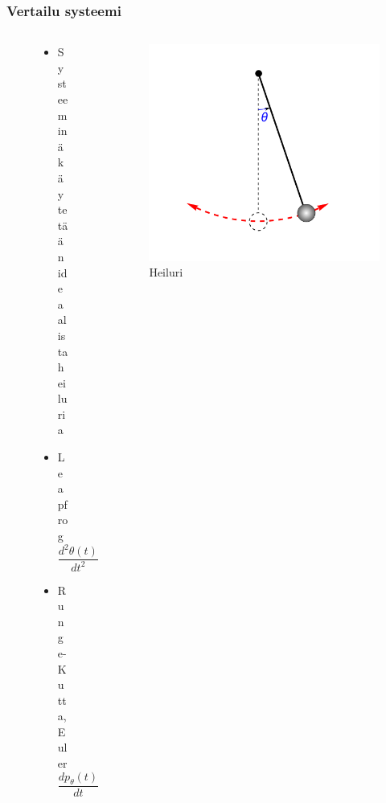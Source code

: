 \documentclass[finnish, 11pt, fleqn]{beamer}
\begin{document}
\begin{frame}
	\frametitle{Vertailu systeemi}
	\begin{columns}[onlytextwidth]
		\begin{column}{.5\textwidth}
			\begin{figure}
				\vspace{-3em}
    			\begin{itemize}
    				\item{Systeeminä käytetään ideaalista heiluria}
    				\vspace{0.5em}
    				\item{Leapfrog\\}
    				\vspace{0.5em}
    				\hspace{-2.0em}$\dfrac{d^2\theta(t)}{dt^2} = -\sin(\theta)$
    				\vspace{1.0em}
    				\item{Runge-Kutta, Euler\\}
    				\vspace{0.5em}
    				\hspace{-2.0em}$\dfrac{dp_{\theta}(t)}{dt} = -\sin(\theta), \: \dfrac{d\theta}{dt} = p_{\theta}$
    			\end{itemize}
			\end{figure}
		\end{column}
		\hfill
		\begin{column}{.55\textwidth}
			\vspace{-1.5em}			
			\begin{figure}[h!]
				\includegraphics[scale=0.7]{graphics/pendulum.png}
				\vspace{-2.5em}				
				{\caption{Heiluri}}
			\end{figure}
		\end{column}
	\end{columns}
\end{frame}
\end{document}
